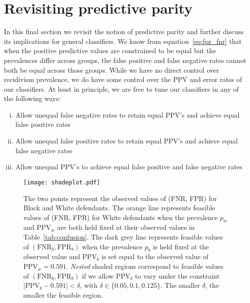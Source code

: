 \documentclass[11pt, svgnames]{article}
\newcommand{\fpr}{\mathrm{FPR}}
\newcommand{\fnr}{\mathrm{FNR}}
\numberwithin{equation}{section}
\theoremstyle{plain}
\theoremstyle{definition}
\numberwithin{prop}{section}
\numberwithin{corollary}{section}
\begin{document}
\section{Revisiting predictive parity}



In this final section we revisit the notion of predictive parity and further discuss its implications for general classifiers.  We know from equation~\eqref{eq:fpr_fnr} that when the positive predictive values are constrained to be equal but the prevalences differ across groups, the false positive and false negative rates cannot both be equal across those groups.  While we have no direct control over recidivism prevalence, we do have some control over the PPV and error rates of our classifiers.  At least in principle, we are free to tune our classifiers in any of the following ways:

\begin{enumerate}[(i)]
  \item Allow unequal false negative rates to retain equal PPV's and achieve equal false positive rates
  \item Allow unequal false positive rates to retain equal PPV's and achieve equal false negative rates
  \item Allow unequal PPV's to achieve equal false positive and false negative rates
\end{enumerate}

\begin{figure}[ht]
  \centering
  \texttt{[image: shadeplot.pdf]}
  \caption{The two points represent the observed values of (FNR, FPR) for Black and White defendants.  The orange line represents feasible values of (FNR, FPR) for White defendants when the prevalence $p_w$ and $\mathrm{PPV}_w$ are both held fixed at their observed values in Table~\ref{tab:confusion}.  The dark grey line represents feasible values of $(\fnr_b, \fpr_b)$ when the prevalence $p_b$ is held fixed at the observed value and $\mathrm{PPV}_b$ is set equal to the observed value of $\mathrm{PPV}_w = 0.591$.  \emph{Nested} shaded regions correspond to feasible values of $(\fnr_b, \fpr_b)$ if we allow $\mathrm{PPV}_b$ to vary under the constraint $|\mathrm{PPV}_b - 0.591| < \delta$, with $\delta \in \{0.05, 0.1, 0.125\}$.  The smaller $\delta$, the smaller the feasible region. }
  \label{fig:shadeplot}
\end{figure}
\end{document}
